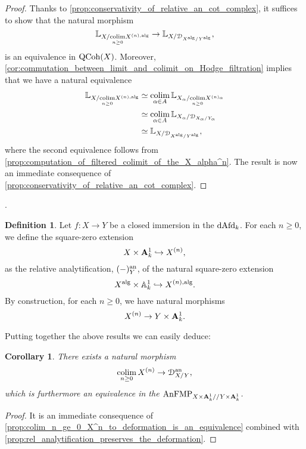 \documentclass[10pt,a4paper,reqno]{amsart} %
\theoremstyle{plain}
\newtheorem{cor}[thm]{Corollary}
\theoremstyle{definition}
\newtheorem{defin}[thm]{Definition}
\theoremstyle{remark}
\numberwithin{equation}{section}
\begin{document}
\begin{proof}
    Thanks to \cref{prop:conservativity_of_relative_an_cot_complex}, it suffices to show that the natural morphism
        \[
            \mathbb L_{X/ \underset{n \ge 0}{\operatorname*{colim}} X^{(n), \mathrm{alg}}} \to \mathbb L_{X/ \mathcal D_{X^\mathrm{alg}/ Y^\mathrm{alg}}},  
        \]
    is an equivalence in $\mathrm{QCoh}(X)$. Moreover, \cref{cor:commutation_between_limit_and_colimit_on_Hodge_filtration} implies that we have a natural equivalence
        \begin{align*}
            \mathbb L_{X/ \underset{n \ge 0}{\operatorname*{colim}} X^{(n), \mathrm{alg}}} & \simeq \operatorname*{colim}_{\alpha \in A} \mathbb L_{X_\alpha/ \underset{n \ge 0}{\operatorname*{colim}} X^{(n)_\alpha}} \\
                                                                       & \simeq \operatorname*{colim}_{\alpha \in A} \mathbb L_{X_\alpha/ \mathcal D_{X_\alpha/ Y_\alpha}} \\
                                                                       & \simeq \mathbb L_{X/ \mathcal D_{X ^\mathrm{alg}/ Y ^\mathrm{alg}}},
        \end{align*}
    where the second equivalence follows from \cref{prop:computation_of_filtered_colimit_of_the_X_alpha^n}. The result is now an immediate consequence of
    \cref{prop:conservativity_of_relative_an_cot_complex}.
\end{proof}.


\begin{defin}
    Let $f \colon X \to Y$ be a closed immersion in the \infcat $\mathrm{dAfd}_k$. For each $n \ge 0$, we define the square-zero extension
        \[
            X \times \mathbf A^1_k \hookrightarrow X^{(n)},  
        \]
    as the relative analytification, $(-) ^\mathrm{an}_Y$, of the natural square-zero extension
        \[
            X ^\mathrm{alg} \times \mathbb A^1_k \hookrightarrow X^{(n), \mathrm{alg}}.  
        \]
    By construction, for each $n \ge 0$, we have natural morphisms
        \[
            X^{(n)} \to Y \times \mathbf A^1_k.  
        \]
\end{defin}

Putting together the above results we can easily deduce:

\begin{cor}
    There exists a natural morphism
        \[
            \operatorname*{colim}_{n \ge 0} X^{(n)} \to \mathcal D^\mathrm{an}_{X/ Y},  
        \]
    which is furthermore an equivalence in the \infcat $\mathrm{AnFMP}_{X \times \mathbf A^1_k/ /Y \times \mathbf A^1_k}$.
\end{cor}

\begin{proof}
    It is an immediate consequence of \cref{prop:colim_n_ge_0_X^n_to_deformation_is_an_equivalence} combined with \cref{prop:rel_analytification_preserves_the_deformation}.
\end{proof}
\end{document}
